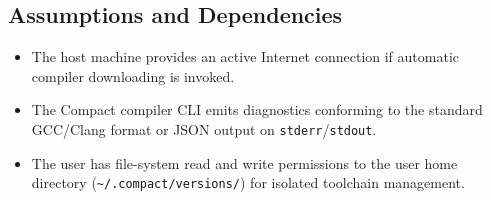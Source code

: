 \subsection{Assumptions and Dependencies}
\begin{itemize}
    \item The host machine provides an active Internet connection if automatic compiler downloading is invoked.
    \item The Compact compiler CLI emits diagnostics conforming to the standard GCC/Clang format or JSON output on \texttt{stderr}/\texttt{stdout}.
    \item The user has file-system read and write permissions to the user home directory (\texttt{\textasciitilde/.compact/versions/}) for isolated toolchain management.
\end{itemize}
